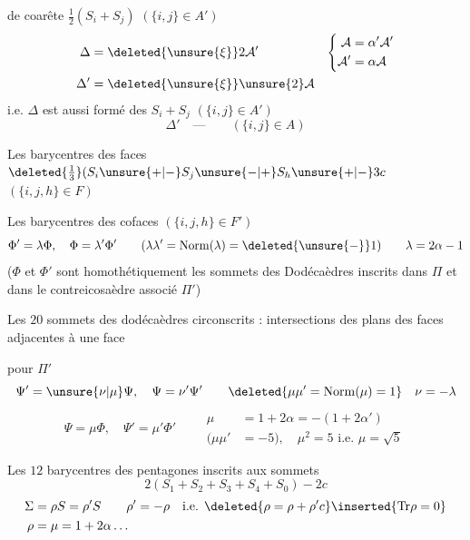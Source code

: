 \unsure{---}  de coarête $\frac12(S_i+S_j)$ $(\{i,j\}\in A')$
\[
\begin{aligned}
\Delta&=\deleted{\unsure{\xi}}2\mathcal A'&\left\{\begin{aligned}\mathcal A&=\alpha'\mathcal A'\\\mathcal A'&=\alpha\mathcal A\end{aligned}\right.\\
\Delta'&=\deleted{\unsure{\xi}}\unsure{2}\mathcal A
\end{aligned}
\]
i.e. $\Delta$ est aussi formé des $S_i+S_j$ $(\{i,j\}\in A')$
\[
\Delta'\quad\text{---}\qquad(\{i,j\}\in A)
\]

\margin{$\Phi$}
Les  barycentres des faces $\deleted{\tfrac13}(S_i\unsure{+|-}S_j\unsure{-|+}S_h\unsure{+|-}3c$ $(\{i,j,h\}\in F)$

Les  barycentres des cofaces $(\{i,j,h\}\in F')$
\[
\Phi'=\lambda\Phi,\quad\Phi=\lambda'\Phi'\qquad(\lambda\lambda'=\mathrm{Norm}(\lambda)=\deleted{\unsure{-}}1)\qquad\lambda=2\alpha-1
\]
($\Phi$ et $\Phi'$ sont homothétiquement les sommets des Dodécaèdres inscrits dans $\Pi$ et dans le contreicosaèdre associé $\Pi'$)

\margin{$\Psi$}
Les $20$ sommets  des dodécaèdres circonscrits  : intersections des plans des faces adjacentes à une face

 pour $\Pi'$
\[
\Psi'=\unsure{\nu|\mu}\Psi,\quad\Psi=\nu'\Psi'\qquad\deleted{\mu\mu'=\mathrm{Norm}(\mu)=1}\quad\nu=-\lambda
\]
\[
\boxed{\Psi=\mu\Phi,\quad\Psi'=\mu'\Phi'}
\qquad\begin{aligned}
\mu&=1+2\alpha=-(1+2\alpha')\\
(\mu\mu'&=-5),\quad\mu^2=5\text{ i.e. }\mu=\sqrt5
\end{aligned}
\]

\margin{$\Sigma$}
Les $12$  barycentres des pentagones inscrits aux sommets
\[
2(S_1+S_2+S_3+S_4+S_0)-2c
\]
\[
\begin{aligned}
\Sigma&=\rho S=\rho'S\qquad\rho'=-\rho\quad\text{i.e. }\deleted{\rho=\rho+\rho'c}\inserted{\mathrm{Tr}\rho=0}\\
\rho&=\mu=1+2\alpha\ldots
\end{aligned}
\]

